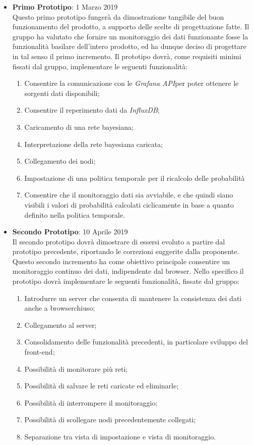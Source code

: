 \begin{itemize}
	\item \textbf{Primo Prototipo}: 1 Marzo 2019\\
	Questo primo prototipo fungerà da dimostrazione tangibile del buon funzionamento del prodotto, a supporto
	delle scelte di progettazione fatte. Il gruppo ha valutato che fornire un monitoraggio dei dati funzionante fosse la funzionalità basilare dell'intero prodotto, ed ha dunque deciso di progettare in tal senso il primo incremento. Il prototipo dovrà, come requisiti minimi fissati dal gruppo, implementare le seguenti funzionalità:
	\begin{enumerate}	%
		\item Consentire la comunicazione con le \textit{Grafana API}\glossario per poter ottenere le sorgenti dati disponibili;
		\item Consentire il reperimento dati da \textit{InfluxDB}\glossario;
		\item Caricamento di una rete bayesiana;
		\item Interpretazione della rete bayesiana caricata;
		\item Collegamento dei nodi;
		\item Impostazione di una politica temporale per il ricalcolo delle probabilità
		\item Consentire che il monitoraggio dati sia avviabile, e che quindi siano visibili i valori di probabilità calcolati ciclicamente in base a quanto definito nella politica temporale.
	\end{enumerate}
	
	\item \textbf{Secondo Prototipo}: 10 Aprile 2019\\
	Il secondo prototipo dovrà dimostrare di essersi evoluto a partire dal prototipo precedente, riportando le correzioni suggerite dalla proponente. Questo secondo incremento ha come obiettivo principale consentire un monitoraggio continuo dei dati, indipendente dal browser. Nello specifico il prototipo dovrà implementare le seguenti funzionalità, fissate dal gruppo:
	\begin{enumerate} %
		\item Introdurre un server che consenta di mantenere la consistenza dei dati anche a browser\glossario chiuso;
		\item Collegamento al server;
		\item Consolidamento delle funzionalità precedenti, in particolare sviluppo del front-end;
		\item Possibilità di monitorare più reti;
		\item Possibilità di salvare le reti caricate ed eliminarle;
		\item Possibilità di interrompere il monitoraggio;
		\item Possibilità di scollegare nodi precedentemente collegati;
		\item Separazione tra vista di impostazione e vista di monitoraggio.
	\end{enumerate}

\end{itemize}


